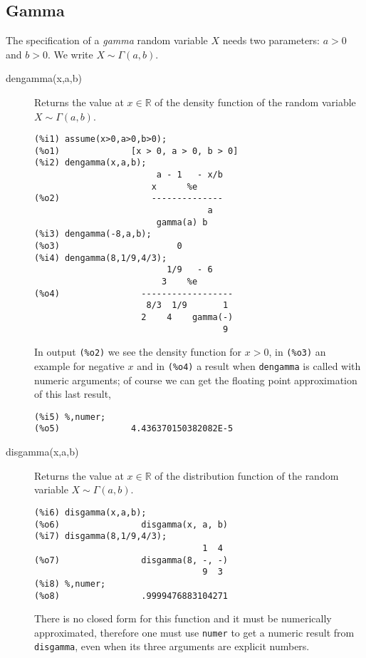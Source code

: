 \documentclass[12pt,a4paper]{article}
\newcommand{\R}{\mathbb{R}}
\begin{document}
\subsection{Gamma} \label{gamma}

The specification of a \emph{gamma} random variable $X$ needs two parameters: $a > 0$ and $b > 0$. We write $X \sim \Gamma(a,b)$.

\begin{description}

\item[dengamma(x,a,b)] Returns the value at $x \in \R$ of the density function of the random variable $X \sim \Gamma(a,b)$.

\begin{verbatim}
(%i1) assume(x>0,a>0,b>0);
(%o1)              [x > 0, a > 0, b > 0]
(%i2) dengamma(x,a,b);
                        a - 1   - x/b
                       x      %e
(%o2)                  --------------
                                  a
                        gamma(a) b
(%i3) dengamma(-8,a,b);
(%o3)                       0
(%i4) dengamma(8,1/9,4/3);
                          1/9   - 6
                         3    %e
(%o4)                ------------------
                      8/3  1/9       1
                     2    4    gamma(-)
                                     9
\end{verbatim}
In output \verb|(%o2)| we see the density function for $x>0$, in \verb|(%o3)| an example for negative $x$ and in \verb|(%o4)| a result when \verb|dengamma| is called with numeric arguments; of course we can get the floating point approximation of this last result,
\begin{verbatim}
(%i5) %,numer;
(%o5)              4.436370150382082E-5
\end{verbatim}

\item[disgamma(x,a,b)] Returns the value at $x \in \R$ of the distribution function of the random variable $X \sim \Gamma(a,b)$.

\begin{verbatim}
(%i6) disgamma(x,a,b);
(%o6)                disgamma(x, a, b)
(%i7) disgamma(8,1/9,4/3);
                                 1  4
(%o7)                disgamma(8, -, -)
                                 9  3
(%i8) %,numer;
(%o8)                .9999476883104271
\end{verbatim}
There is no closed form for this function and it must be numerically approximated, therefore one must use \verb|numer| to get a numeric result from \verb|disgamma|, even when its three arguments are explicit numbers.


\end{description}
\end{document}
